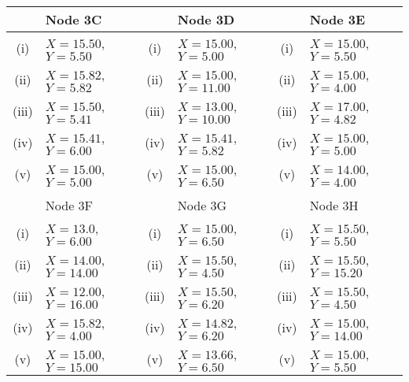 \documentclass[a4paper,12pt]{article}
\begin{document}
\begin{tabular}{||c|l||c|l||c|l||}
  	\hline  & Node 3C &   & Node 3D &  & Node 3E  \\  \hline
  	\hline (i) & $X= 15.50$, $Y= 5.50$ &  (i) & $X= 15.00$, $Y  = 5.00$  & (i)  & $X= 15.00$, $Y= 5.50$\\  \hline
  	\hline (ii) & $X= 15.82$, $Y= 5.82$  & (ii) & $X= 15.00$, $Y =11.00 $ &(ii) & $X= 15.00$, $Y= 4.00$ \\  \hline
  	\hline (iii)  & $X= 15.50$, $Y= 5.41$  & (iii) & $X= 13.00$, $Y = 10.00$ & (iii)  & $X= 17.00$, $Y= 4.82$\\  \hline
  	\hline (iv)  & $X= 15.41$, $Y  = 6.00$  &  (iv) & $X= 15.41$, $Y  = 5.82$ & (iv) & $X= 15.00$, $Y= 5.00$ \\  \hline
  	\hline (v) & $X= 15.00$, $Y= 5.00$ & (v) & $X= 15.00 $, $Y= 6.50$  &(v) & $X= 14.00$, $Y= 4.00$\\  \hline & & & & & \\
  	\hline 
  	\hline  &  Node 3F &  & Node 3G &   & Node 3H \\  \hline
  	\hline (i) & $X= 13.0$, $Y= 6.00$ & (i) & $X= 15.00$, $Y  = 6.50$  & (i)  & $X= 15.50$, $Y= 5.50$\\  \hline
  	\hline (ii)  & $X= 14.00$, $Y = 14.00$  & (ii) & $X= 15.50 $, $Y= 4.50$ & (ii) & $X= 15.50$, $Y = 15.20$ \\  \hline
  	\hline (iii) & $X= 12.00$, $Y = 16.00 $   & (iii) & $X= 15.50$, $Y= 6.20$ &(iii) & $X= 15.50$, $Y= 4.50$ \\  \hline
  	\hline (iv)  & $X= 15.82$, $Y= 4.00$  & (iv) & $X= 14.82$, $Y= 6.20$ & (iv)  & $X= 15.00 $, $Y = 14.00$\\  \hline
  	\hline (v) & $X= 15.00$, $Y = 15.00$ & (v)  & $X= 13.66$, $Y  = 6.50 $ & (v) & $X= 15.00$, $Y= 5.50$\\  \hline
  	\hline 
  	
  \end{tabular} 
  
  
\end{document}
